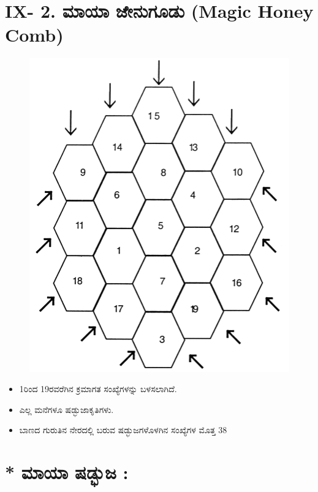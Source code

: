 \section*{IX- 2. ಮಾಯಾ ಜೇನುಗೂಡು (Magic Honey Comb)}

\begin{figure}[H]
\includegraphics{src/figures/chap8/fig8-8.jpg}
\end{figure}
\begin{itemize}
	\item 1ರಿಂದ 19ರವರೆಗಿನ ಕ್ರಮಾಗತ ಸಂಖ್ಯೆಗಳನ್ನು ಬಳಸಲಾಗಿದೆ.
	\item ಎಲ್ಲ ಮನೆಗಳೂ ಷಡ್ಭುಜಾಕೃತಿಗಳು.
	\item ಬಾಣದ ಗುರುತಿನ ನೇರದಲ್ಲಿ ಬರುವ ಷಡ್ಭುಜಗಳೊಳಗಿನ ಸಂಖ್ಯೆಗಳ ಮೊತ್ತ $\boxed{38}$
\end{itemize}

\section*{* ಮಾಯಾ ಷಡ್ಭುಜ :}

